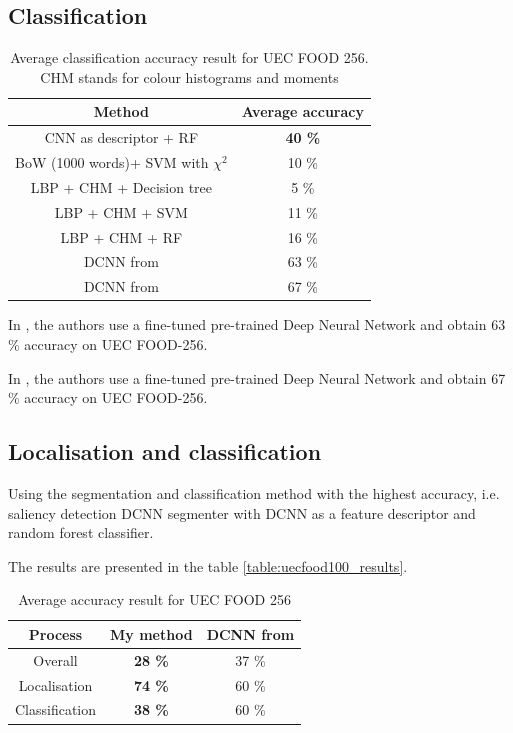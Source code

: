 \subsection{Classification}

\begin{table}
    \centering
    \renewcommand{\arraystretch}{1.2}
    \begin{tabulary}{\textwidth}{| c | C|}
        \hline
        Method & Average accuracy \\
        \hline
        CNN as descriptor + RF & \textbf{40 \%} \\ 
        \hline
        BoW (1000 words)+ SVM with $\chi^2$ & 10 \% \\ %
        \hline
        LBP + CHM + Decision tree & 5 \% \\ 
        \hline
        LBP + CHM + SVM & 11 \% \\ %
        \hline
        LBP + CHM + RF & 16 \% \\ %
        \hline
        DCNN from \cite{Bolanos2016} & 63 \%\\
        \hline 
        DCNN from \cite{Yanai2015} & 67 \%\\
        \hline 
    \end{tabulary}
    \caption[Average classification accuracy result for UEC FOOD 256]{Average classification accuracy result for UEC FOOD 256. CHM stands for colour histograms and moments}
\end{table}

In \cite{Bolanos2016}, the authors use a fine-tuned pre-trained Deep Neural Network and obtain 63 \% accuracy on UEC FOOD-256.

In \cite{Yanai2015}, the authors use a fine-tuned pre-trained Deep Neural Network and obtain 67 \% accuracy on UEC FOOD-256.


\subsection{Localisation and classification}

Using the segmentation and classification method with the highest accuracy, i.e. saliency detection DCNN segmenter with DCNN as a feature descriptor and random forest classifier.

The results are presented in the table \ref{table:uecfood100_results}.

\begin{table}
    \centering
    \renewcommand{\arraystretch}{1.2}
    \begin{tabulary}{\textwidth}{| c | C C|}
        \hline
        Process & My method & DCNN from \cite{Bolanos2016} \\
        \hline
        Overall & \textbf{28 \%} & 37 \% \\ 
        \hline
        Localisation &  \textbf{74 \%} & 60 \% \\
        \hline
        Classification &  \textbf{38 \%} & 60 \% \\
        \hline
    \end{tabulary}
    \caption{Average accuracy result for UEC FOOD 256}
    \label{table:uecfodd256_results}
\end{table}

